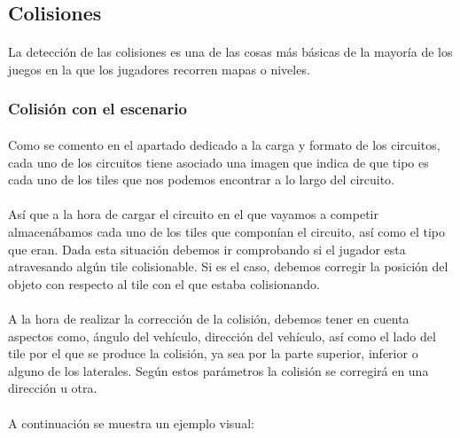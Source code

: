 \documentclass[a4paper,11pt]{article} %
\begin{document}
\subsection{Colisiones}

\paragraph{}
La detección de las colisiones es una de las cosas más básicas de la mayoría de los juegos en la que los jugadores
recorren mapas o niveles.

\subsubsection{Colisión con el escenario}

\paragraph{}
Como se comento en el apartado dedicado a la carga y formato de los circuitos, cada uno de los circuitos tiene asociado una imagen
que indica de que tipo es cada uno de los tiles que nos podemos encontrar a lo largo del circuito.

\paragraph{}
Así que a la hora de cargar el circuito en el que vayamos a competir almacenábamos cada uno de los tiles que componían el circuito,
así como el tipo que eran. Dada esta situación debemos ir comprobando si el jugador esta atravesando algún tile colisionable. 
Si es el caso, debemos corregir la posición del objeto con respecto al tile con el que estaba colisionando.

\paragraph{}
A la hora de realizar la corrección de la colisión, debemos tener en cuenta aspectos como, ángulo del vehículo, dirección del 
vehículo, así como el lado del tile por el que se produce la colisión, ya sea por la parte superior, inferior o alguno 
de los laterales. Según estos parámetros la colisión se corregirá en una dirección u otra.

\paragraph{}
A continuación se muestra un ejemplo visual:
\end{document}
